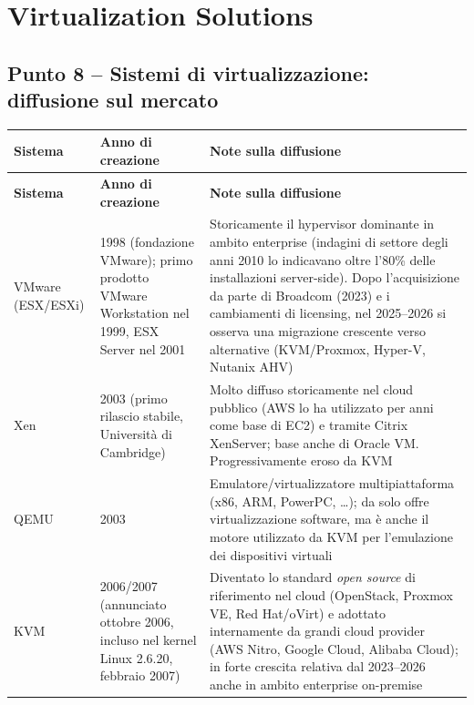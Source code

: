 \documentclass[11pt,a4paper]{article}
\begin{document}
\newpage
\section{Virtualization Solutions}

\subsection{Punto 8 -- Sistemi di virtualizzazione: diffusione sul mercato}

\begin{center}
\begin{longtable}{p{3.2cm}p{2.6cm}p{7.6cm}}
\toprule
\textbf{Sistema} & \textbf{Anno di creazione} & \textbf{Note sulla diffusione} \\
\midrule
\endfirsthead
\toprule
\textbf{Sistema} & \textbf{Anno di creazione} & \textbf{Note sulla diffusione} \\
\midrule
\endhead
VMware (ESX/ESXi) & 1998 (fondazione VMware); primo prodotto VMware Workstation nel 1999, ESX Server nel 2001 & Storicamente il hypervisor dominante in ambito enterprise (indagini di settore degli anni 2010 lo indicavano oltre l'80\% delle installazioni server-side). Dopo l'acquisizione da parte di Broadcom (2023) e i cambiamenti di licensing, nel 2025--2026 si osserva una migrazione crescente verso alternative (KVM/Proxmox, Hyper-V, Nutanix AHV) \\
Xen & 2003 (primo rilascio stabile, Università di Cambridge) & Molto diffuso storicamente nel cloud pubblico (AWS lo ha utilizzato per anni come base di EC2) e tramite Citrix XenServer; base anche di Oracle VM. Progressivamente eroso da KVM \\
QEMU & 2003 & Emulatore/virtualizzatore multipiattaforma (x86, ARM, PowerPC, \dots); da solo offre virtualizzazione software, ma è anche il motore utilizzato da KVM per l'emulazione dei dispositivi virtuali \\
KVM & 2006/2007 (annunciato ottobre 2006, incluso nel kernel Linux 2.6.20, febbraio 2007) & Diventato lo standard \emph{open source} di riferimento nel cloud (OpenStack, Proxmox VE, Red Hat/oVirt) e adottato internamente da grandi cloud provider (AWS Nitro, Google Cloud, Alibaba Cloud); in forte crescita relativa dal 2023--2026 anche in ambito enterprise on-premise \\
\bottomrule
\end{longtable}
\end{center}
\end{document}
